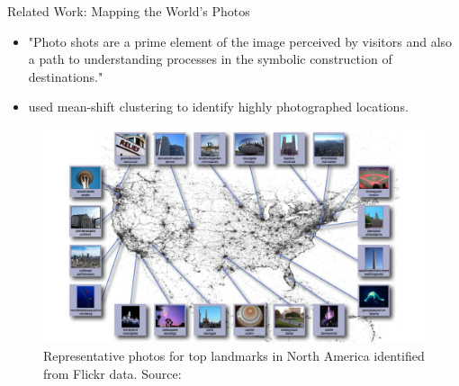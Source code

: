\documentclass{beamer}
\begin{document}
\begin{frame}{Related Work: Mapping the World's Photos}
  \begin{itemize}
    \item "Photo shots are a prime element of the image perceived by visitors and also a path to understanding processes in the symbolic construction of destinations." \citet{Donaire2014}
    \item \citet{Kleinberg2009} used mean-shift clustering to identify highly photographed locations.
  \end{itemize}
  \begin{figure}\centering
    \includegraphics[scale=0.15]{kleinberg2009}
    \caption{Representative photos for top landmarks in North America identified from Flickr data. Source: \citet{Kleinberg2009}}
  \end{figure}
\end{frame}
\end{document}
